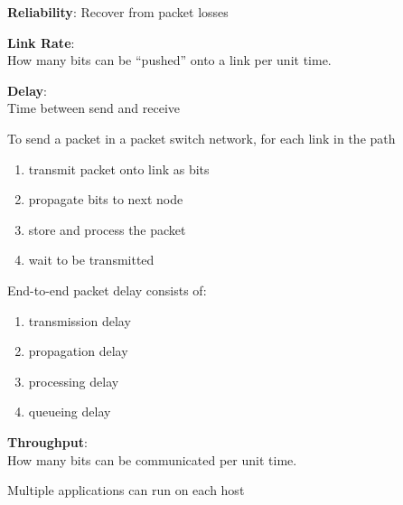 \begin{frame}\begin{center}\large
\textbf{Reliability}: Recover from packet losses
\end{center}\end{frame}

\begin{frame}\begin{center}\large
\textbf{Link Rate}:\\ How many bits can be ``pushed'' onto a link per unit time.
\end{center}\end{frame}

\begin{frame}\begin{center}\large
\textbf{Delay}:\\ Time between send and receive
\end{center}\end{frame}

\begin{frame}\normalsize
To send a packet in a packet switch network, for each link in the path
\begin{enumerate}
\item transmit packet onto link as bits
\item propagate bits to next node
\item store and process the packet
\item wait to be transmitted
\end{enumerate}
\end{frame}

\begin{frame}\normalsize
End-to-end packet delay consists of:
\begin{enumerate}
\item transmission delay
\item propagation delay
\item processing delay
\item queueing delay
\end{enumerate}
\end{frame}



\begin{cf}{
\textbf{Throughput}:\\ How many bits can be communicated per unit time.
}
\end{cf}

\begin{frame}[t]\normalsize
	Multiple applications can run on each host
\end{frame}

